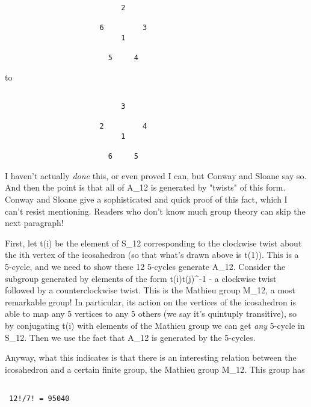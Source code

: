 \begin{verbatim}

                           2
 
                      6         3
                           1
                        
                        5     4
\end{verbatim}
    

to 



\begin{verbatim}

                           3
 
                      2         4
                           1
                        
                        6     5

\end{verbatim}
    


I haven't actually \emph{done} this, or even proved I can, but Conway
and Sloane say so.  And then the point is that all of A_{12} is
generated by "twists" of this form.  Conway and Sloane give a
sophisticated and quick proof of this fact, which I can't resist
mentioning.  Readers who don't know much group theory can skip the next
paragraph!


First, let t(i) be the element of S_{12} corresponding to the
clockwise twist about the ith vertex of the icosahedron (so that what's
drawn above is t(1)).  This is a 5-cycle, and we need to show these 12
5-cycles generate A_{12}.  Consider the subgroup generated by
elements of the form t(i)t(j)^{-1} - a clockwise twist followed
by a counterclockwise twist.  This is the Mathieu group M_{12},
a most remarkable group!  In particular, its action on the vertices of
the icosahedron is able to map any 5 vertices to any 5 others (we say
it's quintuply transitive), so by conjugating t(i) with elements of the
Mathieu group we can get \emph{any} 5-cycle in S_{12}.  Then
we use the fact that A_{12} is generated by the 5-cycles.

Anyway, what this indicates is that there is an interesting relation
between the icosahedron and a certain finite group, the Mathieu group
M_{12}.  This group has


\begin{verbatim}

 12!/7! = 95040 
\end{verbatim}
    


